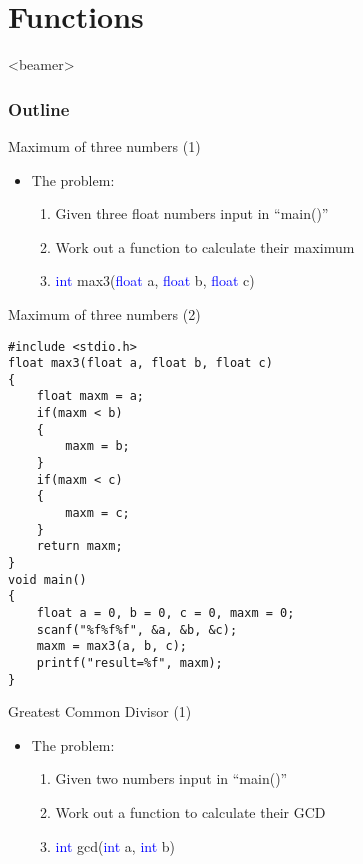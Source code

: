 \section{Functions}
\label{sec:func}
\begin{frame}<beamer>
    \frametitle{Outline}
    \tableofcontents[currentsection]
\end{frame}

\begin{frame}{Maximum of three numbers (1)}

\begin{itemize}
	\item {The problem:}
	\begin{enumerate}
		\item {Given three float numbers input in ``main()''}
		\item {Work out a function to calculate their maximum}
		\item {\textcolor{blue}{int} max3(\textcolor{blue}{float} a, \textcolor{blue}{float} b, \textcolor{blue}{float} c)}
	\end{enumerate}
\end{itemize}

\end{frame}


\ifx\answer\undefined
\begin{frame}[fragile]{Maximum of three numbers (2)}
\vspace{-0.1in}
\begin{lstlisting}[xleftmargin=0.05\linewidth, linewidth=0.9\linewidth,basicstyle=\small]
#include <stdio.h>
float max3(float a, float b, float c)
{
    float maxm = a;
    if(maxm < b)
    {
        maxm = b;
    }
    if(maxm < c)
    {
        maxm = c;
    }
    return maxm;
}
void main()
{
    float a = 0, b = 0, c = 0, maxm = 0;
    scanf("%f%f%f", &a, &b, &c);
    maxm = max3(a, b, c);
    printf("result=%f", maxm);
}

\end{lstlisting}
\end{frame}
\fi

\begin{frame}{Greatest Common Divisor (1)}

\begin{itemize}
	\item {The problem:}
	\begin{enumerate}
		\item {Given two numbers input in ``main()''}
		\item {Work out a function to calculate their GCD}
		\item {\textcolor{blue}{int} gcd(\textcolor{blue}{int} a, \textcolor{blue}{int} b)}
	\end{enumerate}
\end{itemize}

\end{frame}

